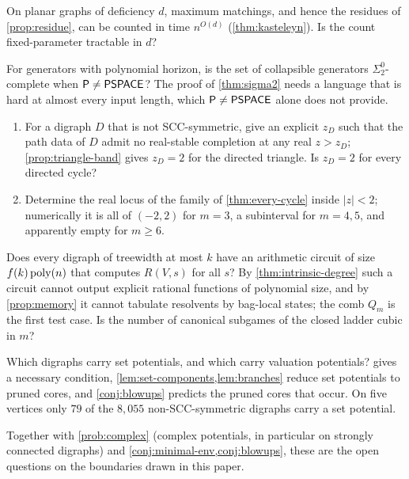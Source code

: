 \begin{problem}\label{prob:fpt-deficiency}
On planar graphs of deficiency $d$, maximum matchings, and hence the residues of \cref{prop:residue}, can be counted in time $n^{O(d)}$ (\cref{thm:kasteleyn}). Is the count fixed-parameter tractable in $d$?
\end{problem}

\begin{problem}\label{prob:sigma2}
For generators with polynomial horizon, is the set of collapsible generators $\Sigma^0_2$-complete when $\mathsf{P}\neq\mathsf{PSPACE}$? The proof of \cref{thm:sigma2} needs a language that is hard at almost every input length, which $\mathsf{P}\neq\mathsf{PSPACE}$ alone does not provide.
\end{problem}

\begin{problem}\label{prob:band}
\begin{enumerate}[label=\textup{(\alph*)}]
\item For a digraph $D$ that is not SCC-symmetric, give an explicit $z_D$ such that the path data of $D$ admit no real-stable completion at any real $z>z_D$; \cref{prop:triangle-band} gives $z_D=2$ for the directed triangle. Is $z_D=2$ for every directed cycle?
\item Determine the real locus of the family of \cref{thm:every-cycle} inside $|z|<2$; numerically it is all of $(-2,2)$ for $m=3$, a subinterval for $m=4,5$, and apparently empty for $m\ge6$.
\end{enumerate}
\end{problem}

\begin{problem}\label{prob:tw-circuits}
Does every digraph of treewidth at most $k$ have an arithmetic circuit of size $f(k)\operatorname{poly}(n)$ that computes $R(V,s)$ for all $s$? By \cref{thm:intrinsic-degree} such a circuit cannot output explicit rational functions of polynomial size, and by \cref{prop:memory} it cannot tabulate resolvents by bag-local states; the comb $Q_m$ is the first test case. Is the number of canonical subgames of the closed ladder cubic in $m$?
\end{problem}

\begin{problem}\label{prob:setpot}
Which digraphs carry set potentials, and which carry valuation potentials?  gives a necessary condition, \cref{lem:set-components,lem:branches} reduce set potentials to pruned cores, and \cref{conj:blowups} predicts the pruned cores that occur. On five vertices only $79$ of the $8{,}055$ non-SCC-symmetric digraphs carry a set potential.
\end{problem}

Together with \cref{prob:complex} (complex potentials, in particular on strongly connected digraphs) and \cref{conj:minimal-env,conj:blowups}, these are the open questions on the boundaries drawn in this paper.
